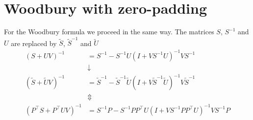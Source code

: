 \documentclass[11pt]{article}
\numberwithin{figure}{section}
\numberwithin{table}{section}
\begin{document}
\section{Woodbury with zero-padding}
For the Woodbury formula we proceed in the same way. The matrices $S$, $S^{-1}$ and $U$ are replaced by $\widetilde{S}$, $\widetilde{S}^{-1}$ and $\widetilde{U}$
\begin{align}
\left(S+UV\right)^{-1} &= S^{-1} - S^{-1}U(I+VS^{-1}U)^{-1}VS^{-1}\\
	&\downarrow \\
\left(\widetilde{S}+\widetilde{U}V\right)^{-1} &= \widetilde{S}^{-1} - \widetilde{S}^{-1}\widetilde{U}(I+V\widetilde{S}^{-1}\widetilde{U})^{-1}V\widetilde{S}^{-1} \\
		&\Updownarrow \\
\left(P^\top S+P^\top UV\right)^{-1} &= S^{-1}P - S^{-1}PP^\top U(I+VS^{-1}PP^\top U)^{-1}VS^{-1}P
\end{align}

\clearpage
{}


		
\end{document}
